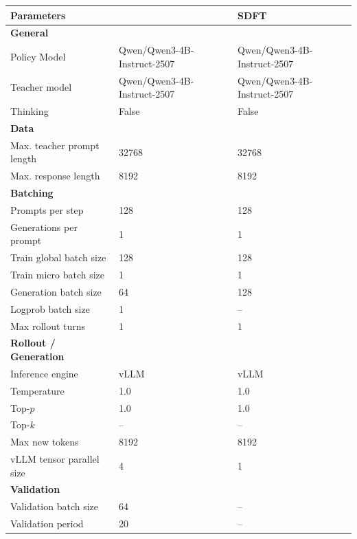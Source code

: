\begin{table}[h!]
\centering
\small
\setlength{\tabcolsep}{8pt}
\renewcommand{\arraystretch}{1.15}
\fontsize{8pt}{8.5pt}\selectfont
\begin{tabular}{p{3.5cm}p{4cm}p{4cm}}
\toprule
\textbf{Parameters} & \textbf{\ours{}} & \textbf{SDFT} \\
\midrule

\textbf{General} & & \\
Policy Model & Qwen/Qwen3-4B-Instruct-2507 & Qwen/Qwen3-4B-Instruct-2507 \\
Teacher model & Qwen/Qwen3-4B-Instruct-2507 & Qwen/Qwen3-4B-Instruct-2507 \\
Thinking & False & False \\

\midrule
\textbf{Data} & & \\
Max. teacher prompt length & 32768 & 32768 \\
Max. response length & 8192 & 8192 \\

\midrule
\textbf{Batching} & & \\
Prompts per step & 128 & 128 \\
Generations per prompt & 1 & 1 \\
Train global batch size & 128 & 128 \\
Train micro batch size & 1 & 1 \\
Generation batch size & 64 & 128 \\
Logprob batch size & 1 & -- \\
Max rollout turns & 1 & 1 \\

\midrule
\textbf{Rollout / Generation} & & \\
Inference engine & vLLM & vLLM \\
Temperature & 1.0 & 1.0 \\
Top-$p$ & 1.0 & 1.0 \\
Top-$k$ & -- & -- \\
Max new tokens & 8192 & 8192 \\
vLLM tensor parallel size & 4 & 1 \\

\midrule
\textbf{Validation} & & \\
Validation batch size & 64 & -- \\
Validation period & 20 & -- \\


\end{tabular}
\end{table}
